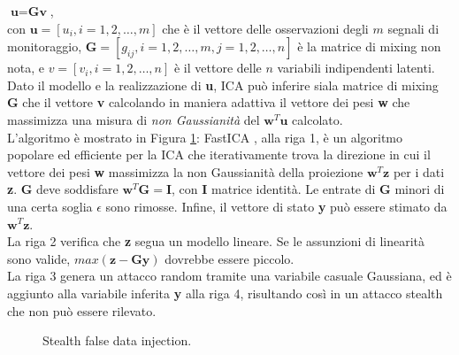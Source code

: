 \indent $\textbf{u} = \textbf{Gv}$,\\
con $\textbf{u} = [u_i, i = 1,2, \ldots, m]$ che è il vettore delle osservazioni degli $m$ segnali di monitoraggio, $\textbf{G} = [g_{ij}, i = 1, 2, \ldots,m, j = 1 ,2, \ldots, n]$ è la matrice di mixing non nota, e $v = [v_i, i = 1, 2, \ldots, n]$ è il vettore delle $n$ variabili indipendenti latenti.\\
Dato il modello e la realizzazione di \textbf{u}, ICA può inferire siala matrice di mixing \textbf{G} che il vettore \textbf{v} calcolando in maniera adattiva il vettore dei pesi \textbf{w} che massimizza una misura di \emph{non Gaussianità} del $\textbf{w}^T\textbf{u}$ calcolato.\\
L'algoritmo è mostrato in Figura \ref{algo1}: FastICA \cite{lica}, alla riga 1, è un algoritmo popolare ed efficiente per la ICA che iterativamente trova la direzione in cui il vettore dei pesi \textbf{w} massimizza la non Gaussianità della proiezione $\textbf{w}^T\textbf{z}$ per i dati \textbf{z}. \textbf{G} deve soddisfare $\textbf{w}^T\textbf{G} = \textbf{I}$, con \textbf{I} matrice identità. Le entrate di \textbf{G} minori di una certa soglia $\epsilon$ sono rimosse. Infine, il vettore di stato \textbf{y} può essere stimato da $\textbf{w}^T\textbf{z}$.\\
La riga 2 verifica che \textbf{z} segua un modello lineare. Se le assunzioni di linearità sono valide, $max(\textbf{z} - \textbf{Gy})$ dovrebbe essere piccolo.\\
La riga 3 genera un attacco random tramite una variabile casuale Gaussiana, ed è aggiunto alla variabile inferita \textbf{y} alla riga 4, risultando così in un attacco stealth che non può essere rilevato.
\begin{figure}[htbp]
	\centering
	\caption{Stealth false data injection.}
	\label{algo1}
\end{figure}	

